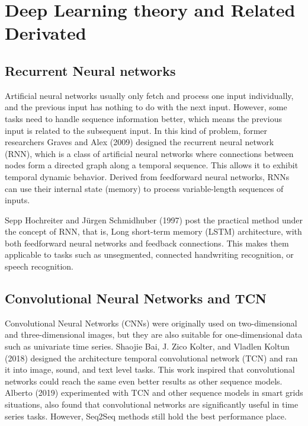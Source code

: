 
\chapter{Deep Learning theory and Related Derivated} %

\label{Chapter2} %

\setlength{\parindent}{0pt}

\section{Recurrent Neural networks}

Artificial neural networks usually only fetch and process one input individually, and the previous input has nothing to do with the next input. However, some tasks need to handle sequence information better, which means the previous input is related to the subsequent input. In this kind of problem, former researchers Graves and Alex (2009) designed the recurrent neural network (RNN), which is a class of artificial neural networks where connections between nodes form a directed graph along a temporal sequence. This allows it to exhibit temporal dynamic behavior. Derived from feedforward neural networks, RNNs can use their internal state (memory) to process variable-length sequences of inputs.

Sepp Hochreiter and Jürgen Schmidhuber (1997) post the practical method under the concept of RNN, that is, Long short-term memory (LSTM) architecture, with both feedforward neural networks and feedback connections.  This makes them applicable to tasks such as unsegmented, connected handwriting recognition, or speech recognition.

\section{Convolutional Neural Networks and TCN}

Convolutional Neural Networks (CNNs) were originally used on two-dimensional and three-dimensional images, but they are also suitable for one-dimensional data such as univariate time series. Shaojie Bai, J. Zico Kolter, and Vladlen Koltun (2018) designed the architecture temporal convolutional network (TCN) and ran it into image, sound, and text level tasks. This work inspired that convolutional networks could reach the same even better results as other sequence models. Alberto (2019) experimented with TCN and other sequence models in smart grids situations, also found that convolutional networks are significantly useful in time series tasks. However, Seq2Seq methods still hold the best performance place.

